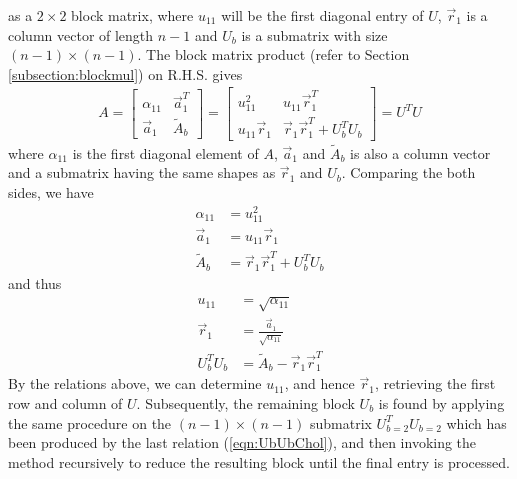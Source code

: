 as a $2 \times 2$ block matrix, where $u_{11}$ will be the first diagonal entry of $U$, $\vec{r}_1$ is a column vector of length $n-1$ and $U_b$ is a submatrix with size $(n-1) \times (n-1)$. The block matrix product (refer to Section \ref{subsection:blockmul}) on R.H.S. gives
\begin{align}
A = 
\begin{bmatrix}
\alpha_{11} & \vec{a}_1^T \\
\vec{a}_1 & \tilde{A}_b 
\end{bmatrix}
=
\begin{bmatrix}
u_{11}^2 & u_{11}\vec{r}_1^T \\
u_{11}\vec{r}_1 & \vec{r}_1\vec{r}_1^T + U_b^T U_b
\end{bmatrix}
= U^TU
\end{align}
where $\alpha_{11}$ is the first diagonal element of $A$, $\vec{a}_1$ and $\tilde{A}_b$ is also a column vector and a submatrix having the same shapes as $\vec{r}_1$ and $U_b$. Comparing the both sides, we have
\begin{subequations}
\begin{align}
\alpha_{11} &= u_{11}^2 \\
\vec{a}_1 &= u_{11}\vec{r}_1 \\
\tilde{A}_b &= \vec{r}_1\vec{r}_1^T + U_b^T U_b
\end{align}    
\end{subequations}
and thus
\begin{subequations}
\begin{align}
u_{11} &= \sqrt{\alpha_{11}} \\
\vec{r}_1 &= \frac{\vec{a}_1}{\sqrt{\alpha_{11}}} \\
U_b^T U_b &= \tilde{A}_b - \vec{r}_1\vec{r}_1^T \label{eqn:UbUbChol}
\end{align}
\end{subequations}
By the relations above, we can determine $u_{11}$, and hence $\vec{r}_1$, retrieving the first row and column of $U$. Subsequently, the remaining block $U_b$ is found by applying the same procedure on the $(n-1) \times (n-1)$ submatrix $U_{b=2}^T U_{b=2}$ which has been produced by the last relation (\ref{eqn:UbUbChol}), and then invoking the method recursively to reduce the resulting block until the final entry is processed.
